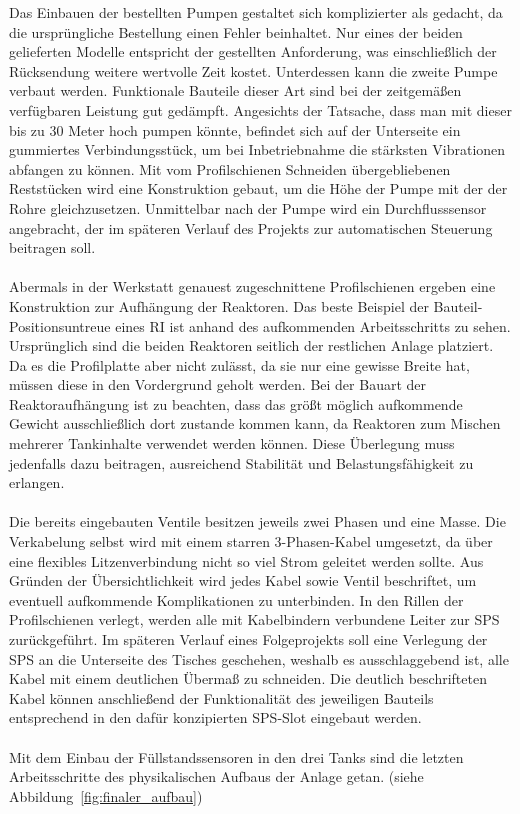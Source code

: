 	Das Einbauen der bestellten Pumpen gestaltet sich komplizierter als gedacht, da die ursprüngliche Bestellung einen Fehler beinhaltet. Nur eines der beiden gelieferten Modelle entspricht der gestellten Anforderung, was einschließlich der Rücksendung weitere wertvolle Zeit kostet. Unterdessen kann die zweite Pumpe verbaut werden. Funktionale Bauteile dieser Art sind bei der zeitgemäßen verfügbaren Leistung gut gedämpft. Angesichts der Tatsache, dass man mit dieser bis zu 30 Meter hoch pumpen könnte, befindet sich auf der Unterseite ein gummiertes Verbindungsstück, um bei Inbetriebnahme die stärksten Vibrationen abfangen zu können. Mit vom Profilschienen Schneiden übergebliebenen Reststücken wird eine Konstruktion gebaut, um die Höhe der Pumpe mit der der Rohre gleichzusetzen. Unmittelbar nach der Pumpe wird ein Durchflusssensor angebracht, der im späteren Verlauf des Projekts zur automatischen Steuerung beitragen soll.\\\\
	Abermals in der Werkstatt genauest zugeschnittene Profilschienen ergeben eine Konstruktion zur Aufhängung der Reaktoren. Das beste Beispiel der Bauteil-Positionsuntreue eines \ac{RI} ist anhand des aufkommenden Arbeitsschritts zu sehen. Ursprünglich sind die beiden Reaktoren seitlich der restlichen Anlage platziert. Da es die Profilplatte aber nicht zulässt, da sie nur eine gewisse Breite hat, müssen diese in den Vordergrund geholt werden. Bei der Bauart der Reaktoraufhängung ist zu beachten, dass das größt möglich aufkommende Gewicht ausschließlich dort zustande kommen kann, da Reaktoren zum Mischen mehrerer Tankinhalte verwendet werden können. Diese Überlegung muss jedenfalls dazu beitragen, ausreichend Stabilität und Belastungsfähigkeit zu erlangen.\\\\	
	Die bereits eingebauten Ventile besitzen jeweils zwei Phasen und eine Masse. Die Verkabelung selbst wird mit einem starren 3-Phasen-Kabel umgesetzt, da über eine flexibles Litzenverbindung nicht so viel Strom geleitet   werden sollte. Aus Gründen der Übersichtlichkeit wird jedes Kabel sowie Ventil beschriftet, um eventuell aufkommende Komplikationen zu unterbinden. In den Rillen der Profilschienen verlegt, werden alle mit Kabelbindern verbundene Leiter zur \ac{SPS} zurückgeführt. Im späteren Verlauf eines Folgeprojekts soll eine Verlegung der \ac{SPS} an die Unterseite des Tisches geschehen, weshalb es ausschlaggebend ist, alle Kabel mit einem deutlichen Übermaß zu schneiden. Die deutlich beschrifteten Kabel können anschließend der Funktionalität des jeweiligen Bauteils entsprechend in den dafür konzipierten \ac{SPS}-Slot eingebaut werden.\\\\
	Mit dem Einbau der Füllstandssensoren in den drei Tanks sind die letzten Arbeitsschritte des physikalischen Aufbaus der Anlage getan. (siehe Abbildung~\ref{fig:finaler_aufbau})
	
